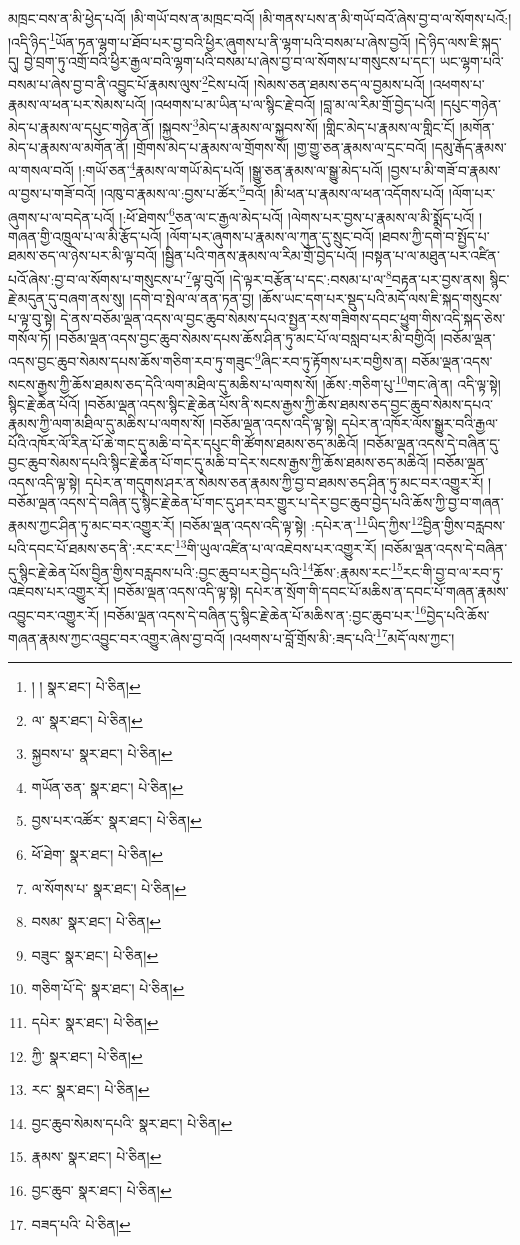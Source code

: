 མཁྲང་བས་ན་མི་ཕྱེད་པའོ། །མི་གཡོ་བས་ན་མཁྲང་བའོ། །མི་གནས་པས་ན་མི་གཡོ་བའོ་ཞེས་བྱ་བ་ལ་སོགས་པའོ:། །འདི་ཉིད་\footnote{། །  སྣར་ཐང་།  པེ་ཅིན། }ཡོན་ཏན་ལྷག་པ་ཐོབ་པར་བྱ་བའི་ཕྱིར་ཞུགས་པ་ནི་ལྷག་པའི་བསམ་པ་ཞེས་བྱའོ། །དེ་ཉིད་ལས་ཇི་སྐད་དུ། བྱེ་བྲག་ཏུ་འགྲོ་བའི་ཕྱིར་རྒྱལ་བའི་ལྷག་པའི་བསམ་པ་ཞེས་བྱ་བ་ལ་སོགས་པ་གསུངས་པ་དང་། ཡང་ལྷག་པའི་བསམ་པ་ཞེས་བྱ་བ་ནི་འབྱུང་པོ་རྣམས་ལུས་\footnote{ལ་  སྣར་ཐང་།  པེ་ཅིན། }ངེས་པའོ། །སེམས་ཅན་ཐམས་ཅད་ལ་བྱམས་པའོ། །འཕགས་པ་རྣམས་ལ་ཕན་པར་སེམས་པའོ། །འཕགས་པ་མ་ཡིན་པ་ལ་སྙིང་རྗེ་བའོ། །བླ་མ་ལ་རིམ་གྲོ་བྱེད་པའོ། །དཔུང་གཉེན་མེད་པ་རྣམས་ལ་དཔུང་གཉེན་ནོ། །སྐྱབས་\footnote{སྐྱབས་པ་  སྣར་ཐང་།  པེ་ཅིན། }མེད་པ་རྣམས་ལ་སྐྱབས་སོ། །གླིང་མེད་པ་རྣམས་ལ་གླིང་ངོ། །མགོན་མེད་པ་རྣམས་ལ་མགོན་ནོ། །གྲོགས་མེད་པ་རྣམས་ལ་གྲོགས་སོ། །གྱ་གྱུ་ཅན་རྣམས་ལ་དྲང་བའོ། །དམུ་རྒོད་རྣམས་ལ་གསལ་བའོ། །:གཡོ་ཅན་\footnote{གཡོན་ཅན་  སྣར་ཐང་།  པེ་ཅིན། }རྣམས་ལ་གཡོ་མེད་པའོ། །སྒྱུ་ཅན་རྣམས་ལ་སྒྱུ་མེད་པའོ། །བྱས་པ་མི་གཟོ་བ་རྣམས་ལ་བྱས་པ་གཟོ་བའོ། །འཁུ་བ་རྣམས་ལ་:བྱས་པ་ཚོར་\footnote{བྱས་པར་འཚོར་  སྣར་ཐང་།  པེ་ཅིན། }བའོ། །མི་ཕན་པ་རྣམས་ལ་ཕན་འདོགས་པའོ། །ལོག་པར་ཞུགས་པ་ལ་བདེན་པའོ། །:ཕོ་ཐེགས་\footnote{ཕོ་ཐེག་  སྣར་ཐང་།  པེ་ཅིན། }ཅན་ལ་ང་རྒྱལ་མེད་པའོ། །ལེགས་པར་བྱས་པ་རྣམས་ལ་མི་སྨོད་པའོ། །གཞན་གྱི་འཁྲུལ་པ་ལ་མི་རྩོད་པའོ། །ལོག་པར་ཞུགས་པ་རྣམས་ལ་ཀུན་དུ་སྲུང་བའོ། །ཐབས་ཀྱི་དགེ་བ་སྤྱོད་པ་ཐམས་ཅད་ལ་ཉེས་པར་མི་ལྟ་བའོ། །སྦྱིན་པའི་གནས་རྣམས་ལ་རིམ་གྲོ་བྱེད་པའོ། །བསྟན་པ་ལ་མཐུན་པར་འཛིན་པའོ་ཞེས་:བྱ་བ་ལ་སོགས་པ་གསུངས་པ་\footnote{ལ་སོགས་པ་  སྣར་ཐང་།  པེ་ཅིན། }ལྟ་བུའོ། །དེ་ལྟར་བརྩོན་པ་དང་:བསམ་པ་ལ་\footnote{བསམ་  སྣར་ཐང་།  པེ་ཅིན། }བརྟན་པར་བྱས་ནས། སྙིང་རྗེ་མདུན་དུ་བཞག་ནས་སུ། །དགེ་བ་སྤེལ་ལ་ནན་ཏན་བྱ། །ཆོས་ཡང་དག་པར་སྡུད་པའི་མདོ་ལས་ཇི་སྐད་གསུངས་པ་ལྟ་བུ་སྟེ། དེ་ནས་བཅོམ་ལྡན་འདས་ལ་བྱང་ཆུབ་སེམས་དཔའ་སྤྱན་རས་གཟིགས་དབང་ཕྱུག་གིས་འདི་སྐད་ཅེས་གསོལ་ཏོ། །བཅོམ་ལྡན་འདས་བྱང་ཆུབ་སེམས་དཔས་ཆོས་ཤིན་ཏུ་མང་པོ་ལ་བསླབ་པར་མི་བགྱིའོ། །བཅོམ་ལྡན་འདས་བྱང་ཆུབ་སེམས་དཔས་ཆོས་གཅིག་རབ་ཏུ་གཟུང་\footnote{བཟུང་  སྣར་ཐང་།  པེ་ཅིན། }ཞིང་རབ་ཏུ་རྟོགས་པར་བགྱིས་ན། བཅོམ་ལྡན་འདས་སངས་རྒྱས་ཀྱི་ཆོས་ཐམས་ཅད་དེའི་ལག་མཐིལ་དུ་མཆིས་པ་ལགས་སོ། །ཆོས་:གཅིག་པུ་\footnote{གཅིག་པོ་དེ་  སྣར་ཐང་།  པེ་ཅིན། }གང་ཞེ་ན། འདི་ལྟ་སྟེ། སྙིང་རྗེ་ཆེན་པོའོ། །བཅོམ་ལྡན་འདས་སྙིང་རྗེ་ཆེན་པོས་ནི་སངས་རྒྱས་ཀྱི་ཆོས་ཐམས་ཅད་བྱང་ཆུབ་སེམས་དཔའ་རྣམས་ཀྱི་ལག་མཐིལ་དུ་མཆིས་པ་ལགས་སོ། །བཅོམ་ལྡན་འདས་འདི་ལྟ་སྟེ། དཔེར་ན་འཁོར་ལོས་སྒྱུར་བའི་རྒྱལ་པོའི་འཁོར་ལོ་རིན་པོ་ཆེ་གང་དུ་མཆི་བ་དེར་དཔུང་གི་ཚོགས་ཐམས་ཅད་མཆིའོ། །བཅོམ་ལྡན་འདས་དེ་བཞིན་དུ་བྱང་ཆུབ་སེམས་དཔའི་སྙིང་རྗེ་ཆེན་པོ་གང་དུ་མཆི་བ་དེར་སངས་རྒྱས་ཀྱི་ཆོས་ཐམས་ཅད་མཆིའོ། །བཅོམ་ལྡན་འདས་འདི་ལྟ་སྟེ། དཔེར་ན་གདུགས་ཤར་ན་སེམས་ཅན་རྣམས་ཀྱི་བྱ་བ་ཐམས་ཅད་ཤིན་ཏུ་མང་བར་འགྱུར་རོ། །བཅོམ་ལྡན་འདས་དེ་བཞིན་དུ་སྙིང་རྗེ་ཆེན་པོ་གང་དུ་ཤར་བར་གྱུར་པ་དེར་བྱང་ཆུབ་བྱེད་པའི་ཆོས་ཀྱི་བྱ་བ་གཞན་རྣམས་ཀྱང་ཤིན་ཏུ་མང་བར་འགྱུར་རོ། །བཅོམ་ལྡན་འདས་འདི་ལྟ་སྟེ། :དཔེར་ན་\footnote{དཔེར་  སྣར་ཐང་།  པེ་ཅིན། }ཡིད་ཀྱིས་\footnote{ཀྱི་  སྣར་ཐང་།  པེ་ཅིན། }བྱིན་གྱིས་བརླབས་པའི་དབང་པོ་ཐམས་ཅད་ནི་:རང་རང་\footnote{རང་  སྣར་ཐང་།  པེ་ཅིན། }གི་ཡུལ་འཛིན་པ་ལ་འཇེབས་པར་འགྱུར་རོ། །བཅོམ་ལྡན་འདས་དེ་བཞིན་དུ་སྙིང་རྗེ་ཆེན་པོས་བྱིན་གྱིས་བརླབས་པའི་:བྱང་ཆུབ་པར་བྱེད་པའི་\footnote{བྱང་ཆུབ་སེམས་དཔའི་  སྣར་ཐང་།  པེ་ཅིན། }ཆོས་:རྣམས་རང་\footnote{རྣམས་  སྣར་ཐང་།  པེ་ཅིན། }རང་གི་བྱ་བ་ལ་རབ་ཏུ་འཇེབས་པར་འགྱུར་རོ། །བཅོམ་ལྡན་འདས་འདི་ལྟ་སྟེ། དཔེར་ན་སྲོག་གི་དབང་པོ་མཆིས་ན་དབང་པོ་གཞན་རྣམས་འབྱུང་བར་འགྱུར་རོ། །བཅོམ་ལྡན་འདས་དེ་བཞིན་དུ་སྙིང་རྗེ་ཆེན་པོ་མཆིས་ན་:བྱང་ཆུབ་པར་\footnote{བྱང་ཆུབ་  སྣར་ཐང་།  པེ་ཅིན། }བྱེད་པའི་ཆོས་གཞན་རྣམས་ཀྱང་འབྱུང་བར་འགྱུར་ཞེས་བྱ་བའོ། །འཕགས་པ་བློ་གྲོས་མི་:ཟད་པའི་\footnote{བཟད་པའི་  པེ་ཅིན། }མདོ་ལས་ཀྱང་། 